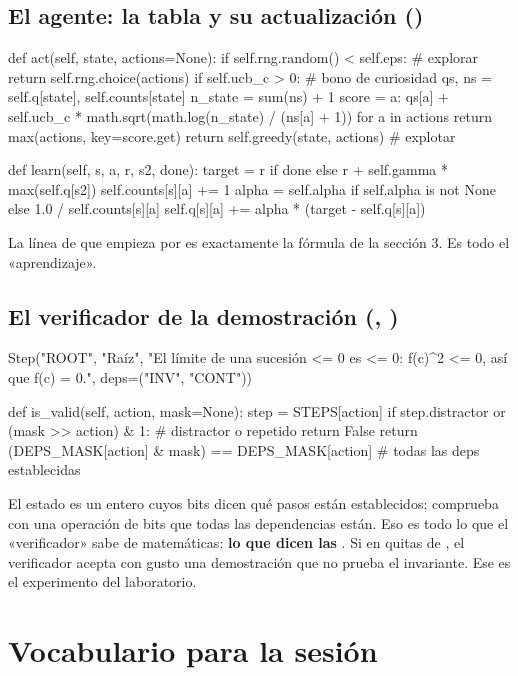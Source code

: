 \subsection*{El agente: la tabla y su actualización ()}
\begin{python}
def act(self, state, actions=None):
    if self.rng.random() < self.eps:          # explorar
        return self.rng.choice(actions)
    if self.ucb_c > 0:                        # bono de curiosidad
        qs, ns = self.q[state], self.counts[state]
        n_state = sum(ns) + 1
        score = {a: qs[a] + self.ucb_c * math.sqrt(math.log(n_state) / (ns[a] + 1)) for a in actions}
        return max(actions, key=score.get)
    return self.greedy(state, actions)        # explotar

def learn(self, s, a, r, s2, done):
    target = r if done else r + self.gamma * max(self.q[s2])
    self.counts[s][a] += 1
    alpha = self.alpha if self.alpha is not None else 1.0 / self.counts[s][a]
    self.q[s][a] += alpha * (target - self.q[s][a])
\end{python}
La línea de  que empieza por  es exactamente la fórmula de la sección 3. Es todo el «aprendizaje».

\subsection*{El verificador de la demostración (, )}
\begin{python}
Step("ROOT", "Raíz",
     "El límite de una sucesión <= 0 es <= 0: f(c)^2 <= 0, así que f(c) = 0.",
     deps=("INV", "CONT"))

def is_valid(self, action, mask=None):
    step = STEPS[action]
    if step.distractor or (mask >> action) & 1:   # distractor o repetido
        return False
    return (DEPS_MASK[action] & mask) == DEPS_MASK[action]   # todas las deps establecidas
\end{python}
El estado es un entero cuyos bits dicen qué pasos están establecidos;  comprueba con una operación de bits que todas las dependencias están. Eso es todo lo que el «verificador» sabe de matemáticas: \textbf{lo que dicen las }. Si en  quitas  de , el verificador acepta con gusto una demostración que no prueba el invariante. Ese es el experimento  del laboratorio.

\section{Vocabulario para la sesión}


